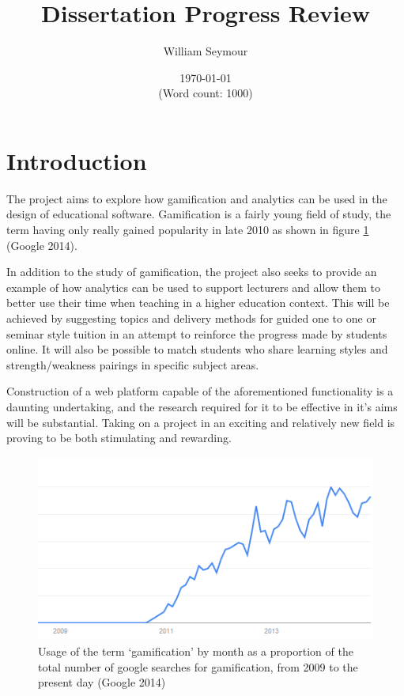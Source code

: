\documentclass[10pt,a4paper]{report}
\author{William Seymour}
\title{Dissertation Progress Review}
\date{\today \\ (Word count: 1000)}
\begin{document}
\maketitle

\section*{Introduction}
The project aims to explore how gamification and analytics can be used in the design of educational software. Gamification is a fairly young field of study, the term having only really gained popularity in late 2010 as shown in figure \ref{usage} (Google 2014).

In addition to the study of gamification, the project also seeks to provide an example of how analytics can be used to support lecturers and allow them to better use their time when teaching in a higher education context. This will be achieved by suggesting topics and delivery methods for guided one to one or seminar style tuition in an attempt to reinforce the progress made by students online. It will also be possible to match students who share learning styles and strength/weakness pairings in specific subject areas.

Construction of a web platform capable of the aforementioned functionality is a daunting undertaking, and the research required for it to be effective in it's aims will be substantial. Taking on a project in an exciting and relatively new field is proving to be both stimulating and rewarding.

\begin{figure}
	\includegraphics{../img/usage-graph.png}
	\caption{Usage of the term `gamification' by month as a proportion of the total number of google searches for gamification, from 2009 to the present day (Google 2014)}
	\label{usage}
\end{figure}
\end{document}
